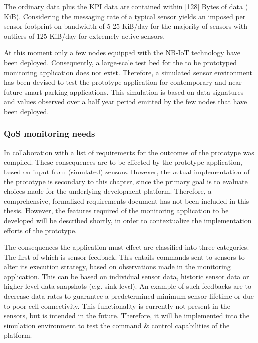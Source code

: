 The ordinary data plus the \ublox KPI data are contained within [128] Bytes of data ( KiB). Considering the messaging rate of a typical sensor yields an imposed per sensor footprint on bandwidth of 5-25 KiB/day for the majority of sensors with outliers of 125 KiB/day for extremely active sensors.

At this moment only a few nodes equipped with the NB-IoT technology have been deployed. Consequently, a large-scale test bed for the to be prototyped monitoring application does not exist. Therefore, a simulated sensor environment has been devised to test the prototype application for contemporary and near-future smart parking applications. This simulation is based on data signatures and values observed over a half year period emitted by the few nodes that have been deployed.

\subsubsection{QoS monitoring needs}
In collaboration with \idsystems a list of requirements for the outcomes of the prototype was compiled. These consequences are to be effected by the prototype application, based on input from (simulated) sensors. However, the actual implementation of the prototype is secondary to this chapter, since the primary goal is to evaluate choices made for the underlying development platform. Therefore, a comprehensive, formalized requirements document has not been included in this thesis. However, the features required of the monitoring application to be developed will be described shortly, in order to contextualize the implementation efforts of the prototype.

The consequences the application must effect are classified into three categories. The first of which is sensor feedback. This entails commands sent to sensors to alter its execution strategy, based on observations made in the monitoring application. This can be based on individual sensor data, historic sensor data or higher level data snapshots (e.g. sink level). An example of such feedbacks are to decrease data rates to guarantee a predetermined minimum sensor lifetime or due to poor cell connectivity. This functionality is currently not present in the \nedap sensors, but is intended in the future. Therefore, it will be implemented into the simulation environment to test the command \& control capabilities of the platform.

